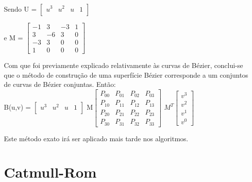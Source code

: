 Sendo U = $\begin{bmatrix}
       u^{3} & u^{2} & u & 1          \\[0.3em]
		\end{bmatrix}$

e M = $\begin{bmatrix}
		       -1 & 3 & -3  & 1           \\[0.3em]
		        3 & -6 &  3 & 0   \\[0.3em]
		       -3 & 3 & 0 & 0 \\[0.3em]
		       1 & 0 & 0 & 0
		     \end{bmatrix}$

Com que foi previamente explicado relativamente às curvas de Bézier, conclui-se
que o método de construção de uma superfície Bézier corresponde a um conjuntos
de curvas de Bézier conjuntas. 
Então:
\begin{equation}
	
	\label{}
\end{equation}
B(u,v) = $\begin{bmatrix}
       u^{3} & u^{2} & u & 1          \\[0.3em]
		\end{bmatrix}$ 
		M$\begin{bmatrix}
		       P_{00} & P_{01} & P_{02} & P_{03}   \\[0.3em]
		       P_{10} & P_{11} & P_{12} & P_{13}   \\[0.3em]
		       P_{20} & P_{21} & P_{22} & P_{23}   \\[0.3em]
		       P_{30} & P_{31} & P_{32} & P_{33}
		     \end{bmatrix}$
		$M^{T} \begin{bmatrix}
		       v^{3}           \\[0.3em]
		       v^{2}   \\[0.3em]
		       v^{1} \\[0.3em]
		       v^{0}
		     \end{bmatrix}$

Este método exato irá ser aplicado mais tarde nos algoritmos.
\section{Catmull-Rom}